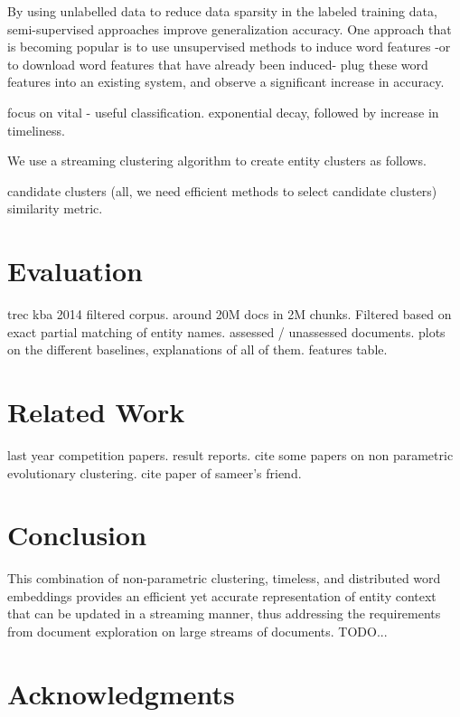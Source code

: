 \documentclass{article}
\begin{document}
By using unlabelled data to reduce data sparsity in the labeled training data, semi-supervised approaches improve generalization accuracy.
One approach that is becoming popular is to use unsupervised methods to induce word features -or to download word features that have already been induced- plug these word features into an existing system, and observe a significant increase in accuracy.


focus on vital - useful classification.
exponential decay, followed by increase in timeliness.

We use a streaming clustering algorithm to create entity clusters as follows.

candidate clusters (all, we need efficient methods to select candidate clusters)
similarity metric.


\section{Evaluation}
\label{evaluation}

trec kba 2014 filtered corpus.
around 20M docs in 2M chunks. Filtered based on exact partial matching of entity names.
assessed / unassessed documents.
plots on the different baselines, explanations of all of them.
features table.

\section{Related Work}
\label{related}

last year competition papers. result reports.
cite some papers on non parametric evolutionary clustering.
cite paper of sameer's friend.


\section{Conclusion}
\label{conclusion}

This combination of non-parametric clustering, timeless, and distributed word embeddings provides an efficient yet accurate representation of entity context that can be updated in a streaming manner, thus addressing the requirements from document exploration on large streams of documents.
TODO...

\section*{Acknowledgments} 
 


\end{document}
